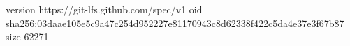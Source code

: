 version https://git-lfs.github.com/spec/v1
oid sha256:03daae105e5c9a47c254d952227e81170943c8d62338f422c5da4e37e3f67b87
size 62271
